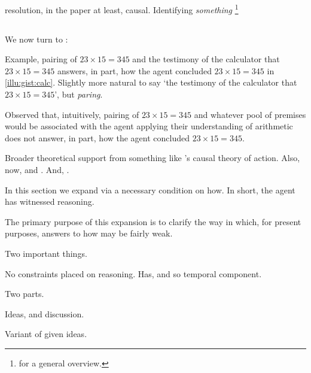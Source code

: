 \begin{note}
  \citeauthor{Davidson:1963aa} resolution, in the \citeyear{Davidson:1963aa} paper at least, causal.
  Identifying \emph{something}%
  \footnote{
    \textcite{Hieronymi:2011aa} for a general overview.
  }
\end{note}

\subsection{\qHow{}}
\label{sec:clar:expand:qHow}

\begin{note}[Introduction]
  We now turn to \qHow{}:
  \vspace{-\baselineskip}
  \begin{quote}
    \questionHowBasic*
  \end{quote}
  Example, pairing of \(23 \times 15 = 345\) and the testimony of the calculator that \(23 \times 15 = 345\) answers, in part, how the agent concluded \(23 \times 15 = 345\) in \autoref{illu:gist:calc}.
  Slightly more natural to say `the testimony of the calculator that \(23 \times 15 = 345\)', but \emph{paring}.

  Observed that, intuitively, pairing of \(23 \times 15 = 345\) and whatever pool of premises would be associated with the agent applying their understanding of arithmetic does not answer, in part, how the agent concluded \(23 \times 15 = 345\).
\end{note}

\begin{note}
  Broader theoretical support from something like \citeauthor{Davidson:1963aa}'s causal theory of action.
  Also, now, \citeauthor{Boghossian:2014aa} and \citeauthor{Broome:2013aa}.
  And, \citeauthor{Wright:2014tt}.
\end{note}

\begin{note}
  In this section we expand via a necessary condition on how.
  In short, the agent has witnessed reasoning.

  The primary purpose of this expansion is to clarify the way in which, for present purposes, answers to how may be fairly weak.

  Two important things.

  No constraints placed on reasoning.
  Has, and so temporal component.
\end{note}

\begin{note}
  Two parts.

  Ideas, and discussion.

  Variant of \qHow{} given ideas.
\end{note}

